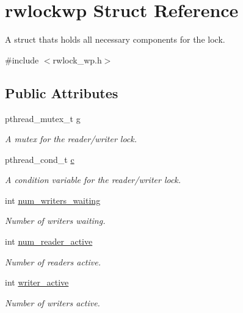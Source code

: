 \hypertarget{structrwlockwp}{}\section{rwlockwp Struct Reference}
\label{structrwlockwp}


A struct thats holds all necessary components for the lock.  




{\ttfamily \#include $<$rwlock\+\_\+wp.\+h$>$}

\subsection*{Public Attributes}
\begin{DoxyCompactItemize}
\item 
pthread\+\_\+mutex\+\_\+t \mbox{\hyperlink{structrwlockwp_aadde32e3b40cb009fe22e7971c612d40}{g}}
\begin{DoxyCompactList}\small\item\em A mutex for the reader/writer lock. \end{DoxyCompactList}\item 
pthread\+\_\+cond\+\_\+t \mbox{\hyperlink{structrwlockwp_acc2d2410bf5f9e811503673564745037}{c}}
\begin{DoxyCompactList}\small\item\em A condition variable for the reader/writer lock. \end{DoxyCompactList}\item 
int \mbox{\hyperlink{structrwlockwp_a6142e0315230df07be53a757b1341ea0}{num\+\_\+writers\+\_\+waiting}}
\begin{DoxyCompactList}\small\item\em Number of writers waiting. \end{DoxyCompactList}\item 
int \mbox{\hyperlink{structrwlockwp_a3de1a0126b2eb5687577561e23c9f153}{num\+\_\+reader\+\_\+active}}
\begin{DoxyCompactList}\small\item\em Number of readers active. \end{DoxyCompactList}\item 
int \mbox{\hyperlink{structrwlockwp_a729763a8ff541dbe85d809e01fbaf5ad}{writer\+\_\+active}}
\begin{DoxyCompactList}\small\item\em Number of writers active. \end{DoxyCompactList}\end{DoxyCompactItemize}


